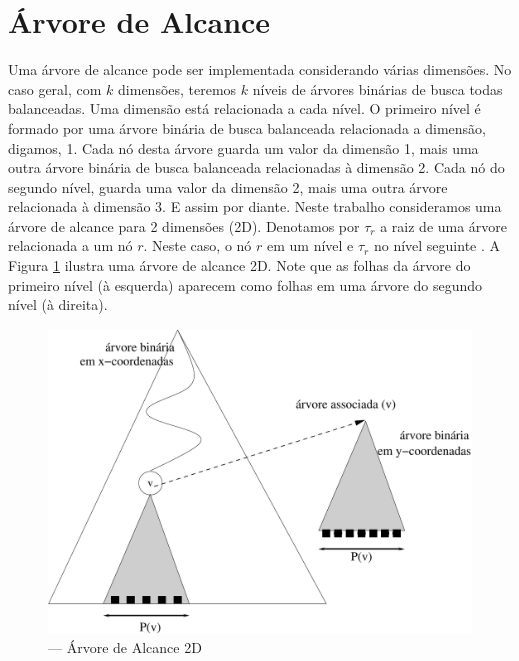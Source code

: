 \section{Árvore de Alcance}

Uma árvore de alcance pode ser implementada considerando várias dimensões. No caso geral, com $k$ dimensões, teremos $k$ níveis de árvores binárias de busca todas balanceadas. Uma dimensão está relacionada a cada nível. O primeiro nível é formado por uma árvore binária de busca balanceada relacionada a dimensão, digamos, 1. Cada nó desta árvore guarda um valor da dimensão 1, mais uma outra árvore binária de busca balanceada relacionadas à dimensão 2. Cada nó do segundo nível, guarda uma valor da dimensão 2, mais uma outra árvore relacionada à dimensão 3. E assim por diante. Neste trabalho consideramos uma árvore de alcance para 2 dimensões (2D). Denotamos por $\tau_r$ a raiz de uma árvore relacionada a um nó $r$. Neste caso, o nó $r$ em um nível e $\tau_r$ no nível seguinte \cite{dsp_rt1}. A Figura \ref{fig:8} ilustra uma árvore de alcance 2D. Note que as folhas da árvore do primeiro nível (à esquerda) aparecem como folhas em uma árvore do segundo nível (à direita). %

\begin{figure}[htb!]
    \begin{center}
        \includegraphics[scale=0.5]{images/range_tree1.pdf}
    \end{center}
    \caption{\label{fig:Fig_26} — Árvore de Alcance 2D}
    \label{fig:8}
\end{figure}

